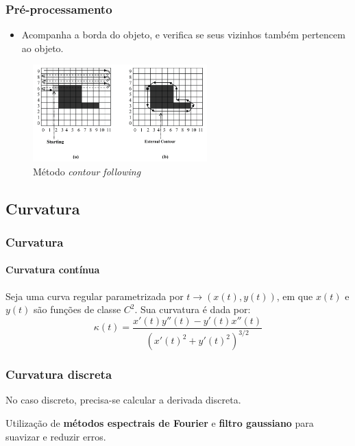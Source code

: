 \begin{frame}
\frametitle{Pré-processamento}

\begin{itemize}
	\item Acompanha a borda do objeto, e verifica se seus vizinhos também pertencem ao objeto.
\end{itemize}

\begin{figure}[hbt]
	\begin{center}
		\caption{Método \textit{contour following}~\cite{book_shape}}
		\includegraphics[width=0.6\textwidth]{img/contorno.png}
	\end{center}
\end{figure}
\end{frame}

\subsection{Curvatura}

\begin{frame}
	\frametitle{Curvatura}
	\framesubtitle{Curvatura contínua}
	
	Seja uma curva regular parametrizada por $t \rightarrow (x(t), y(t))$, em que $x(t)$ e $y(t)$ são funções de classe $C^2$. Sua curvatura é dada por:
	$$\kappa (t) = \frac{x'(t) y''(t) - y'(t) x''(t)}{(x'(t)^2 + y'(t)^2)^{3/2}}$$   
	
\end{frame}


\begin{frame}
\frametitle{Curvatura discreta}
	
	No caso discreto, precisa-se calcular a derivada discreta.
	
	\medskip
	
	Utilização de \textbf{métodos espectrais de Fourier} \cite{brethwashington} e \textbf{filtro gaussiano} para suavizar e reduzir erros.
	
\end{frame}

